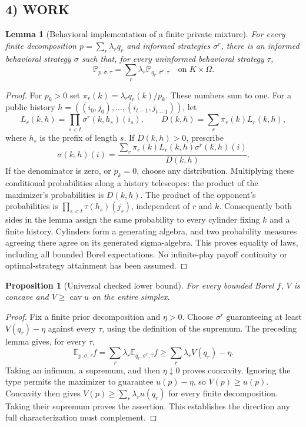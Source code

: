 \documentclass[11pt,a4paper]{article}
\newtheorem{lemma}[theorem]{Lemma}
\newtheorem{proposition}[theorem]{Proposition}
\theoremstyle{definition}
\theoremstyle{remark}
\begin{document}
\subsection*{4) WORK}
\begin{lemma}[Behavioral implementation of a finite private mixture]
For every finite decomposition $p=\sum_r\lambda_rq_r$ and informed strategies $\sigma^r$, there is an informed behavioral strategy $\sigma$ such that, for every uninformed behavioral strategy $\tau$,
\[
 \mathbb P_{p,\sigma,\tau}=\sum_r\lambda_r\mathbb P_{q_r,\sigma^r,\tau}
 \quad\text{on }K\times\Omega.
\]
\end{lemma}
\begin{proof}
For $p_k>0$ set $\pi_r(k)=\lambda_rq_r(k)/p_k$. These numbers sum to one. For a public history $h=((i_0,j_0),\ldots,(i_{t-1},j_{t-1}))$, let
\[
 L_r(k,h)=\prod_{s<t}\sigma^r(k,h_s)(i_s),
 \qquad D(k,h)=\sum_r\pi_r(k)L_r(k,h),
\]
where $h_s$ is the prefix of length $s$. If $D(k,h)>0$, prescribe
\[
 \sigma(k,h)(i)=\frac{\sum_r\pi_r(k)L_r(k,h)\sigma^r(k,h)(i)}{D(k,h)}.
\]
If the denominator is zero, or $p_k=0$, choose any distribution. Multiplying these conditional probabilities along a history telescopes: the product of the maximizer's probabilities is $D(k,h)$. The product of the opponent's probabilities is $\prod_{s<t}\tau(h_s)(j_s)$, independent of $r$ and $k$. Consequently both sides in the lemma assign the same probability to every cylinder fixing $k$ and a finite history. Cylinders form a generating algebra, and two probability measures agreeing there agree on its generated sigma-algebra. This proves equality of laws, including all bounded Borel expectations. No infinite-play payoff continuity or optimal-strategy attainment has been assumed.
\end{proof}

\begin{proposition}[Universal checked lower bound]
For every bounded Borel $f$, $V$ is concave and $V\geq\operatorname{cav}u$ on the entire simplex.
\end{proposition}
\begin{proof}
Fix a finite prior decomposition and $\eta>0$. Choose $\sigma^r$ guaranteeing at least $V(q_r)-\eta$ against every $\tau$, using the definition of the supremum. The preceding lemma gives, for every $\tau$,
\[
 \mathbb E_{p,\sigma,\tau}f
 =\sum_r\lambda_r\mathbb E_{q_r,\sigma^r,\tau}f
 \geq\sum_r\lambda_rV(q_r)-\eta.
\]
Taking an infimum, a supremum, and then $\eta\downarrow0$ proves concavity. Ignoring the type permits the maximizer to guarantee $u(p)-\eta$, so $V(p)\geq u(p)$. Concavity then gives $V(p)\geq\sum_r\lambda_ru(q_r)$ for every finite decomposition. Taking their supremum proves the assertion. This establishes the direction any full characterization must complement.
\end{proof}
\end{document}
